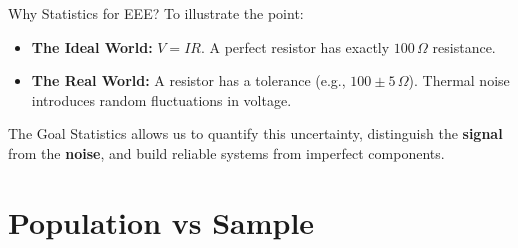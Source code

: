 \begin{frame}{Why Statistics for EEE?}
{To illustrate the point:
}
    \begin{itemize}
        \item \textbf{The Ideal World:} $V = IR$. A perfect resistor has exactly $100\,\Omega$ resistance.
        \item \textbf{The Real World:} A resistor has a tolerance (e.g., $100 \pm 5\,\Omega$). Thermal noise introduces random fluctuations in voltage.
    \end{itemize}
    \pause
        \begin{block}{The Goal}
        Statistics allows us to quantify this uncertainty, distinguish the \textbf{signal} from the \textbf{noise}, and build reliable systems from imperfect components.
    \end{block}
\end{frame}

\section{Population vs Sample}


